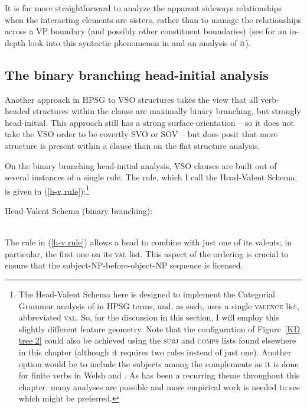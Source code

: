 \documentclass[output=paper,biblatex,babelshorthands,newtxmath,draftmode,colorlinks,citecolor=brown]{langscibook}
\begin{document}
\noindent
It is far more straightforward to analyze the apparent sideways relationships when the interacting elements are sisters, rather than to manage the relationships across a VP boundary (and possibly other constituent boundaries) (see \citealt{ball11} for an in-depth look into this syntactic phenomenon in  and an analysis of it).  

\subsection{The binary branching head-initial analysis} 

Another approach in HPSG to VSO structures takes the view that all verb-headed structures within the clause are maximally binary branching, but strongly head-initial. This approach still has a strong surface-orientation -- so it does not take the VSO order to be covertly SVO or SOV -- but does posit that more structure is present within a clause than on the flat structure analysis. 

On the binary branching head-initial analysis, VSO clauses are built out of several instances of a
single rule. The rule, which I call the Head-Valent Schema, is given in (\ref{h-v
  rule}):\footnote{The Head-Valent Schema here is designed to implement the Categorial Grammar
  analysis of \citet{keenan2000} in HPSG terms, and, as such, uses a single \textsc{valence} list,
  abbreviated \textsc{val}. So, for the discussion in this section, I will employ this slightly
  different feature geometry. Note that the configuration of Figure~\ref{KD tree 2} could also be
  achieved using the \textsc{subj} and \textsc{comps} lists found elsewhere in this chapter
  (although it requires two rules instead of just one). Another option would be to include the
  subjects among the complements as it is done for finite verbs in Welsh \parencites[]{Borsley89b}[--118]{borsley95} and  \citep[]{Pollard90a-Eng}. As has been a recurring theme throughout this chapter, many
  analyses are possible and more empirical work is needed to see which might be preferred.}  
%
\begin{exe}
\ex \label{h-v rule}
Head-Valent Schema (binary branching):\\
 \impl  \\
\end{exe}
%
The rule in (\ref{h-v rule}) allows a head to combine with just one of its valents; in particular, the first one on its \textsc{val} list. This aspect of the ordering is crucial to ensure that the subject-NP-before-object-NP sequence is licensed.
\end{document}
